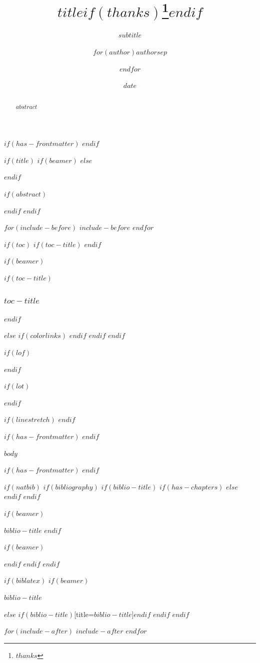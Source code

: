 \documentclass[
$if(fontsize)$
  $fontsize$,
$endif$
$if(lang)$
  $babel-lang$,
$endif$
$if(papersize)$
  $papersize$paper,
$endif$
$if(beamer)$
  ignorenonframetext,
$if(handout)$
  handout,
$endif$
$if(aspectratio)$
  aspectratio=$aspectratio$,
$endif$
$endif$
$for(classoption)$
  $classoption$$sep$,
$endfor$
]{$documentclass$}
\title{$title$$if(thanks)$\thanks{$thanks$}$endif$}
\subtitle{$subtitle$}
\author{$for(author)$$author$$sep$ \and $endfor$}
\date{$date$}
\institute{$for(institute)$$institute$$sep$ \and $endfor$}
\newif\ifbibliography
\begin{document}
  
  $if(has-frontmatter)$
    \frontmatter
  $endif$

  $if(title)$
    $if(beamer)$
      \frame{\titlepage}
    $else$
      \maketitle
    $endif$

    $if(abstract)$
      \begin{abstract}
        $abstract$
      \end{abstract}
    $endif$
  $endif$

  $for(include-before)$
    $include-before$
  $endfor$

  $if(toc)$
    $if(toc-title)$
      \renewcommand*\contentsname{$toc-title$}
    $endif$

    $if(beamer)$
      \begin{frame}[allowframebreaks]
        $if(toc-title)$
          \frametitle{$toc-title$}
        $endif$
        \tableofcontents[hideallsubsections]
      \end{frame}
    $else$
      {
        $if(colorlinks)$
          \hypersetup{linkcolor=$if(toccolor)$$toccolor$$else$$endif$}
        $endif$
        \setcounter{tocdepth}{$toc-depth$}
        \tableofcontents
      }
    $endif$
  $endif$
  
  $if(lof)$
    \listoffigures
  $endif$

  $if(lot)$
    \listoftables
  $endif$

  $if(linestretch)$
  $endif$

  $if(has-frontmatter)$
    \mainmatter
  $endif$

  $body$

  $if(has-frontmatter)$
    \backmatter
  $endif$

  $if(natbib)$
    $if(bibliography)$
      $if(biblio-title)$
        $if(has-chapters)$
          \renewcommand\bibname{$biblio-title$}
        $else$
          \renewcommand\refname{$biblio-title$}
        $endif$
      $endif$
      
      $if(beamer)$
        \begin{frame}[allowframebreaks]{$biblio-title$}
        \bibliographytrue
      $endif$
      
      
      $if(beamer)$
        \end{frame}
      $endif$
    $endif$
  $endif$

  $if(biblatex)$
    $if(beamer)$
      \begin{frame}[allowframebreaks]{$biblio-title$}
        \bibliographytrue
        \printbibliography[heading=none]
      \end{frame}
    $else$
      \printbibliography$if(biblio-title)$[title=$biblio-title$]$endif$
    $endif$
  $endif$
  
  $for(include-after)$
    $include-after$
  $endfor$
\end{document}
